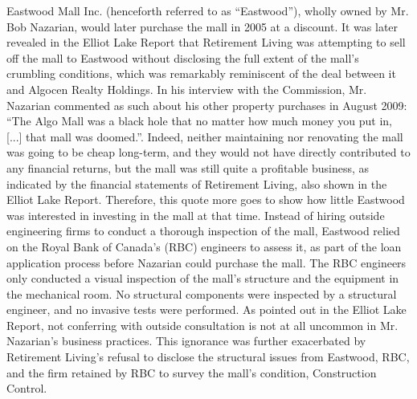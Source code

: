 \documentclass[12pt]{article}
\begin{document}
Eastwood Mall Inc. (henceforth referred to as ``Eastwood''), wholly owned by Mr. Bob Nazarian, would later purchase the mall in 2005 at a discount. It was later revealed in the Elliot Lake Report that Retirement Living was attempting to sell off the mall to Eastwood without disclosing the full extent of the mall's crumbling conditions, which was remarkably reminiscent of the deal between it and Algocen Realty Holdings. In his interview with the Commission, Mr. Nazarian commented as such about his other property purchases in August 2009: ``The Algo Mall was a black hole that no matter how much money you put in, [...] that mall was doomed.''\cite{AlgoLakeReport1}. Indeed, neither maintaining nor renovating the mall was going to be cheap long-term, and they would not have directly contributed to any financial returns, but the mall was still quite a profitable business, as indicated by the financial statements of Retirement Living, also shown in the Elliot Lake Report. Therefore, this quote more goes to show how little Eastwood was interested in investing in the mall at that time. Instead of hiring outside engineering firms to conduct a thorough inspection of the mall, Eastwood relied on the Royal Bank of Canada's (RBC) engineers to assess it, as part of the loan application process before Nazarian could purchase the mall. The RBC engineers only conducted a visual inspection of the mall's structure and the equipment in the mechanical room. No structural components were inspected by a structural engineer, and no invasive tests were performed. As pointed out in the Elliot Lake Report, not conferring with outside consultation is not at all uncommon in Mr. Nazarian's business practices. This ignorance was further exacerbated by Retirement Living's refusal to disclose the structural issues from Eastwood, RBC, and the firm retained by RBC to survey the mall's condition, Construction Control. 
\end{document}
